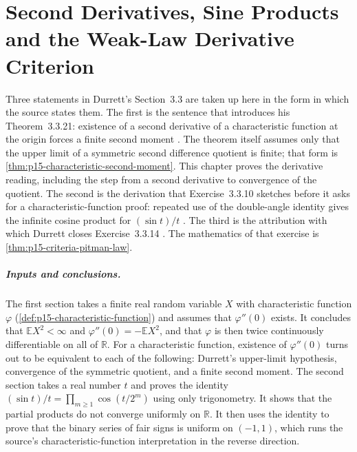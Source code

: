 \chapter{Second Derivatives, Sine Products and the Weak-Law Derivative Criterion}
\label{sec:p15-w02c-p15-013-second-derivatives-and-products}

Three statements in Durrett's Section~3.3 are taken up here in the form in
which the source states them. The first is the sentence that introduces his
Theorem~3.3.21: existence of a second derivative of a characteristic
function at the origin forces a finite second moment
\cite[p.~136, Theorem~3.3.21]{DurrettPTEAuthor2019}. The theorem itself
assumes only that the upper limit of a symmetric second difference quotient
is finite; that form is \cref{thm:p15-characteristic-second-moment}. This
chapter proves the derivative reading, including the step from a second
derivative to convergence of the quotient. The second is the derivation that
Exercise~3.3.10 sketches before it asks for a characteristic-function proof:
repeated use of the double-angle identity gives the infinite cosine product
for \((\sin t)/t\) \cite[p.~133, Exercise~3.3.10]{DurrettPTEAuthor2019}. The
third is the attribution with which Durrett closes Exercise~3.3.14
\cite[p.~136, Exercise~3.3.14]{DurrettPTEAuthor2019}. The mathematics of that
exercise is \cref{thm:p15-criteria-pitman-law}.

\paragraph{Inputs and conclusions.}
The first section takes a finite real random variable \(X\) with
characteristic function \(\varphi\) (\cref{def:p15-characteristic-function})
and assumes that \(\varphi''(0)\) exists. It concludes that
\(\mathbb EX^2<\infty\) and \(\varphi''(0)=-\mathbb EX^2\), and that \(\varphi\)
is then twice continuously differentiable on all of \(\mathbb R\). For a
characteristic function, existence of \(\varphi''(0)\) turns out to be
equivalent to each of the following: Durrett's upper-limit hypothesis,
convergence of the symmetric quotient, and a finite second moment. The
second section takes a real number \(t\) and proves the identity
\((\sin t)/t=\prod_{m\geq1}\cos(t/2^m)\) using only trigonometry. It shows
that the partial products do not converge uniformly on \(\mathbb R\). It
then uses the identity to prove that the binary series of fair signs is
uniform on \((-1,1)\), which runs the source's characteristic-function
interpretation in the reverse direction.

